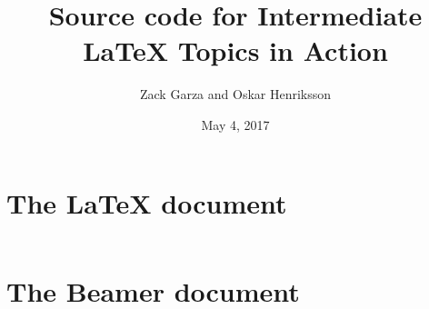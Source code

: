 \documentclass[11pt,letterpaper]{article}
\title{Source code for Intermediate {\LaTeX} Topics in Action}
\author{Zack Garza and Oskar Henriksson}
\date{May 4, 2017}
\begin{document}
\maketitle

\section*{The {\LaTeX} document}
\inputminted[linenos,tabsize=2,breaklines]{LaTeX}{main.tex}

\section*{The Beamer document}
\inputminted[linenos,tabsize=2,breaklines]{LaTeX}{presentation.tex}
\end{document}
